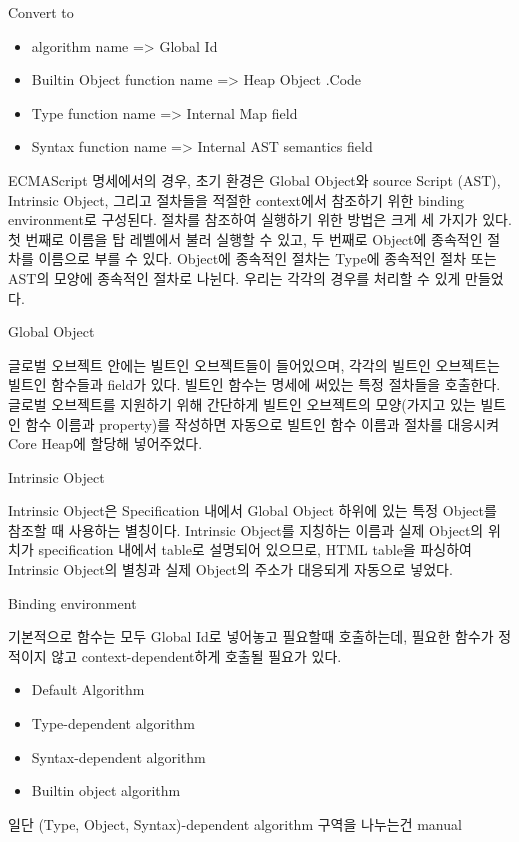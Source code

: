 Convert to
\begin{itemize}
\item algorithm name => Global Id
\item Builtin Object function name => Heap Object .Code
\item Type function name => Internal Map field
\item Syntax function name => Internal AST semantics field
\end{itemize}


 ECMAScript 명세에서의 경우, 초기 환경은 Global Object와 source Script (AST), Intrinsic Object, 그리고 절차들을 적절한 context에서 참조하기 위한 binding environment로 구성된다. 절차를 참조하여 실행하기 위한 방법은 크게 세 가지가 있다. 첫 번째로 이름을 탑 레벨에서 불러 실행할 수 있고, 두 번째로 Object에 종속적인 절차를 이름으로 부를 수 있다. Object에 종속적인 절차는 Type에 종속적인 절차 또는 AST의 모양에 종속적인 절차로 나뉜다.
 우리는 각각의 경우를 처리할 수 있게 만들었다. 

 Global Object

 글로벌 오브젝트 안에는 빌트인 오브젝트들이 들어있으며, 각각의 빌트인 오브젝트는 빌트인 함수들과 field가 있다. 빌트인 함수는 명세에 써있는 특정 절차들을 호출한다. 글로벌 오브젝트를 지원하기 위해 간단하게 빌트인 오브젝트의 모양(가지고 있는 빌트인 함수 이름과 property)를 작성하면 자동으로 빌트인 함수 이름과 절차를 대응시켜 Core Heap에 할당해 넣어주었다.

 Intrinsic Object

 Intrinsic Object은 Specification 내에서 Global Object 하위에 있는 특정 Object를 참조할 때 사용하는 별칭이다. Intrinsic Object를 지칭하는 이름과 실제 Object의 위치가 specification 내에서 table로 설명되어 있으므로, HTML table을 파싱하여 Intrinsic Object의 별칭과 실제 Object의 주소가 대응되게 자동으로 넣었다. 

 Binding environment

기본적으로 함수는 모두 Global Id로 넣어놓고 필요할때 호출하는데, 필요한 함수가 정적이지 않고
context-dependent하게 호출될 필요가 있다.

 
\begin{itemize}
  \item Default Algorithm
  \item Type-dependent algorithm
  \item Syntax-dependent algorithm
  \item Builtin object algorithm
  \end{itemize}
  

일단 (Type, Object, Syntax)-dependent algorithm 구역을 나누는건 manual

